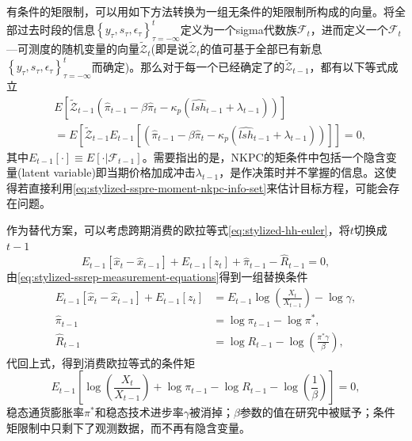 有条件的矩限制，可以用如下方法转换为一组无条件的矩限制所构成的向量。将全部过去时段的信息$\left\{ y_{\tau}, s_{\tau}, \epsilon_{\tau} \right\}_{\tau = - \infty}^{t}$定义为一个sigma代数族$\mathcal{F}_{t}$，进而定义一个$\mathcal{F}_{t}$—可测度的随机变量的向量$\widetilde{\mathcal{Z}}_{t}$(即是说$\widetilde{\mathcal{Z}}_{t}$的值可基于全部已有新息$\left\{ y_{\tau}, s_{\tau}, \epsilon_{\tau} \right\}_{\tau = - \infty}^{t}$而确定)。那么对于每一个已经确定了的$\widetilde{\mathcal{Z}}_{t-1}$，都有以下等式成立
\begin{equation}
  \label{eq:stylized-sspre-moment-nkpc-info-set}
\begin{split}
  & E \left[
  \widetilde{\mathcal{Z}}_{t-1}
  \left(
  \hat{\pi}_{t-1} - \beta \hat{\pi}_{t} - \kappa_{p}
  \left(
  \widehat{lsh}_{t-1} + \lambda_{t-1}
  \right)
  \right)
  \right] \\
  & = E \left[
  \widetilde{\mathcal{Z}}_{t-1}
  E_{t-1}
  \left[
  \left(
  \hat{\pi}_{t-1} - \beta \hat{\pi}_{t} - \kappa_{p}
  \left(
  \widehat{lsh}_{t-1} + \lambda_{t-1}
  \right)
  \right)
  \right]
  \right] = 0,
\end{split}
\end{equation}
其中$E_{t-1} \left[ \cdot \right] \equiv E \left[ \cdot | \mathcal{F}_{t-1} \right]$。需要指出的是，NKPC的矩条件中包括一个隐含变量(latent variable)即当期价格加成冲击$\lambda_{t-1}$，是作决策时并不掌握的信息。这使得若直接利用\eqref{eq:stylized-sspre-moment-nkpc-info-set}来估计目标方程，可能会存在问题。

作为替代方案，可以考虑跨期消费的欧拉等式\eqref{eq:stylized-hh-euler}，将$t$切换成$t-1$
\begin{equation*}
  E_{t-1} \left[
  \hat{x}_{t} - \hat{x}_{t-1}
  \right]
  + E_{t-1} \left[ z_{t} \right]
  + \hat{\pi}_{t-1} - \hat{R}_{t-1}=0,
\end{equation*}
由\eqref{eq:stylized-ssrep-measurement-equations}得到一组替换条件
\begin{equation*}
  \begin{split}
    E_{t-1} \left[
    \hat{x}_{t} - \hat{x}_{t-1}
    \right]
    + E_{t-1} \left[ z_{t} \right] & = E_{t-1} \log \left( \frac{X_{t}}{X_{t-1}} \right) - \log \gamma, \\
    \hat{\pi}_{t-1} & = \log \pi_{t-1} - \log \pi^{*}, \\
    \hat{R}_{t-1} & = \log R_{t-1} - \log \left( \frac{\pi^{*} \gamma }{\beta} \right),
  \end{split}
\end{equation*}
代回上式，得到消费欧拉等式的条件矩
\begin{equation}
  \label{eq:stylized-sspre-moment-euler-info-set}
  E_{t-1} \left[
  \log \left( \frac{X_{t}}{X_{t-1}} \right)
  + \log \pi_{t-1} - \log R_{t-1} - \log \left( \frac{1}{\beta} \right)
  \right]=0,
\end{equation}
稳态通货膨胀率$\pi^{*}$和稳态技术进步率$\gamma$被消掉；$\beta$参数的值在研究中被赋予；条件矩限制中只剩下了观测数据，而不再有隐含变量。

